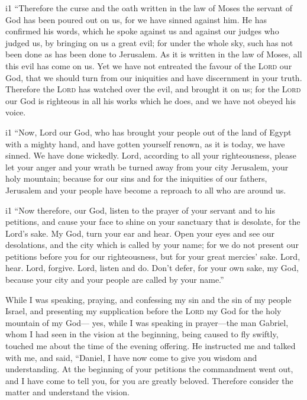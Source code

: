 i1 ``Therefore the curse and the oath written in the law of Moses the
servant of God has been poured out on us, for we have sinned against
him.  He has confirmed his words, which he spoke against
us and against our judges who judged us, by bringing on us a great evil;
for under the whole sky, such has not been done as has been done to
Jerusalem.  As it is written in the law of Moses, all
this evil has come on us. Yet we have not entreated the favour of the
\textsc{Lord} our God, that we should turn from our iniquities and have
discernment in your truth.  Therefore the \textsc{Lord}
has watched over the evil, and brought it on us; for the \textsc{Lord}
our God is righteous in all his works which he does, and we have not
obeyed his voice.

i1  ``Now, Lord our God, who has brought your people out
of the land of Egypt with a mighty hand, and have gotten yourself
renown, as it is today, we have sinned. We have done wickedly.
 Lord, according to all your righteousness, please let
your anger and your wrath be turned away from your city Jerusalem, your
holy mountain; because for our sins and for the iniquities of our
fathers, Jerusalem and your people have become a reproach to all who are
around us.

i1  ``Now therefore, our God, listen to the prayer of
your servant and to his petitions, and cause your face to shine on your
sanctuary that is desolate, for the Lord's sake.  My God,
turn your ear and hear. Open your eyes and see our desolations, and the
city which is called by your name; for we do not present our petitions
before you for our righteousness, but for your great mercies' sake.
 Lord, hear. Lord, forgive. Lord, listen and do. Don't
defer, for your own sake, my God, because your city and your people are
called by your name.''

 While I was speaking, praying, and confessing my sin and
the sin of my people Israel, and presenting my supplication before the
\textsc{Lord} my God for the holy mountain of my God--- 
yes, while I was speaking in prayer---the man Gabriel, whom I had seen
in the vision at the beginning, being caused to fly swiftly, touched me
about the time of the evening offering.  He instructed me
and talked with me, and said, ``Daniel, I have now come to give you
wisdom and understanding.  At the beginning of your
petitions the commandment went out, and I have come to tell you, for you
are greatly beloved. Therefore consider the matter and understand the
vision.

